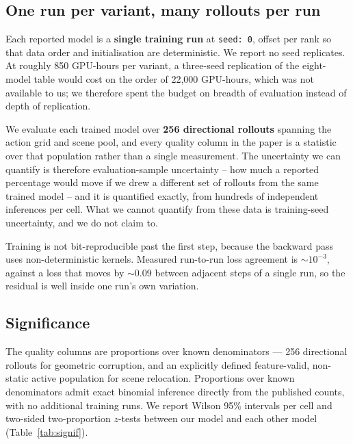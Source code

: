 \documentclass[letterpaper]{article} %
\begin{document}
\subsection{One run per variant, many rollouts per run}

Each reported model is a \textbf{single training run} at \texttt{seed:\ 0},
offset per rank so that data order and initialisation are deterministic. We
report no seed replicates. At roughly 850 GPU-hours per variant, a three-seed
replication of the eight-model table would cost on the order of 22{,}000
GPU-hours, which was not available to us; we therefore spent the budget on
breadth of evaluation instead of depth of replication.

We evaluate each trained model over \textbf{256 directional
rollouts} spanning the action grid and scene pool, and every quality column in
the paper is a statistic over that population rather than a single measurement.
The uncertainty we can quantify is therefore evaluation-sample uncertainty --
how much a reported percentage would move if we drew a different set of
rollouts from the same trained model -- and it is quantified exactly, from
hundreds of independent inferences per cell. What we cannot quantify from these
data is training-seed uncertainty, and we do not claim to.

Training is not bit-reproducible past the first step, because the backward pass
uses non-deterministic kernels. Measured run-to-run loss agreement is
$\sim$$10^{-3}$, against a loss that moves by $\sim$0.09 between adjacent steps
of a single run, so the residual is well inside one run's own variation.

\subsection{Significance}

The quality columns are proportions over known denominators --- 256 directional
rollouts for geometric corruption, and an explicitly defined feature-valid,
non-static active population for scene relocation. Proportions over known
denominators admit exact binomial inference directly from the published counts,
with no additional training runs. We report Wilson 95\% intervals per cell and
two-sided two-proportion $z$-tests between our model and each other model
(Table~\ref{tab:signif}).
\end{document}
